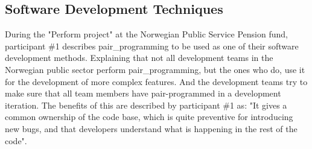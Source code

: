 

\subsection{Software Development Techniques} \label{sec:software_development_techniques}
During the "Perform project" at the Norwegian Public Service Pension fund, participant \#1 describes \gls{pair_programming} to be used as one of their software development methods. Explaining that not all development teams in the Norwegian public sector perform \gls{pair_programming}, but the ones who do, use it for the development of more complex features. And the development teams try to make sure that all team members have pair-programmed in a development iteration. The benefits of this are described by participant \#1 as: "It gives a common ownership of the code base, which is quite preventive for introducing new bugs, and that developers understand what is happening in the rest of the code".


